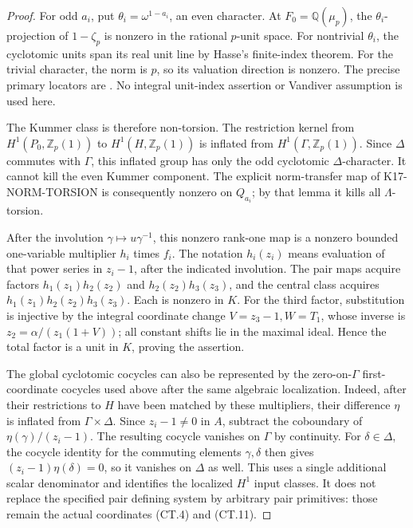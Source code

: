 \documentclass[11pt,a4paper]{article}
\theoremstyle{definition}
\begin{document}
\begin{proof}
For odd \(a_i\), put \(\theta_i=\omega^{1-a_i}\), an even
character. At \(F_0=\mathbb Q(\mu_p)\), the \(\theta_i\)-projection
of \(1-\zeta_p\) is nonzero in the rational \(p\)-unit space.
For nontrivial \(\theta_i\), the cyclotomic units span its real
unit line by Hasse's finite-index theorem. For the trivial character,
the norm is \(p\), so its valuation direction is nonzero. The
precise primary locators are \cite[Theorem~4.3.3 and its proof,
pp.~108--109; Proposition~6.1.5 and its proof,
p.~152]{SharifiIwasawaFull2026}. No integral unit-index assertion or
Vandiver assumption is used here.

The Kummer class is therefore non-torsion. The restriction kernel
from \(H^1(P_0,\mathbb Z_p(1))\) to \(H^1(H,\mathbb Z_p(1))\)
is inflated from \(H^1(\Gamma,\mathbb Z_p(1))\). Since
\(\Delta\) commutes with \(\Gamma\), this inflated group has
only the odd cyclotomic \(\Delta\)-character. It cannot kill the
even Kummer component. The explicit norm-transfer map of
K17-NORM-TORSION is consequently nonzero on \(Q_{a_i}\); by that
lemma it kills all \(\Lambda\)-torsion.

After the involution \(\gamma\mapsto u\gamma^{-1}\), this
nonzero rank-one map is a nonzero bounded one-variable multiplier
\(h_i\) times \(f_i\). The notation \(h_i(z_i)\) means evaluation
of that power series in \(z_i-1\), after the indicated involution.
The pair maps acquire factors \(h_1(z_1)h_2(z_2)\) and
\(h_2(z_2)h_3(z_3)\), and the central class acquires
\(h_1(z_1)h_2(z_2)h_3(z_3)\). Each is nonzero in \(K\).
For the third factor, substitution is injective by the integral
coordinate change \(V=z_3-1,W=T_1\), whose inverse is
\(z_2=\alpha/(z_1(1+V))\); all constant shifts lie in the
maximal ideal. Hence the total factor is a unit in \(K\), proving
the assertion.

The global cyclotomic cocycles can also be represented by the
zero-on-\(\Gamma\) first-coordinate cocycles used above after the
same algebraic localization. Indeed, after their restrictions to
\(H\) have been matched by these multipliers, their difference
\(\eta\) is inflated from \(\Gamma\times\Delta\). Since
\(z_i-1\ne0\) in \(A\), subtract the coboundary of
\(\eta(\gamma)/(z_i-1)\). The resulting cocycle vanishes on
\(\Gamma\) by continuity. For \(\delta\in\Delta\), the
cocycle identity for the commuting elements \(\gamma,\delta\)
then gives \((z_i-1)\eta(\delta)=0\), so it vanishes on
\(\Delta\) as well. This uses a single additional scalar
denominator and identifies the localized \(H^1\) input classes.
It does not replace the specified pair defining system by arbitrary
pair primitives: those remain the actual coordinates (CT.4) and
(CT.11).
\end{proof}
\end{document}

